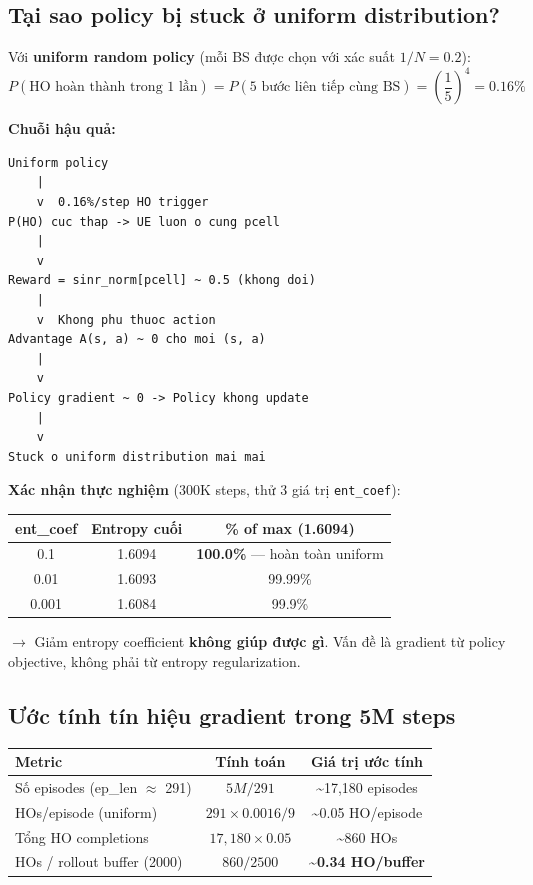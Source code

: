 \documentclass[11pt]{article}
\begin{document}
\subsection{Tại sao policy bị stuck ở uniform distribution?}

Với \textbf{uniform random policy} (mỗi BS được chọn với xác suất $1/N = 0.2$):
\[
P(\text{HO hoàn thành trong 1 lần}) = P(\text{5 bước liên tiếp cùng BS}) = \left(\frac{1}{5}\right)^4 = 0.16\%
\]

\textbf{Chuỗi hậu quả:}

\begin{lstlisting}
Uniform policy
    |
    v  0.16%/step HO trigger
P(HO) cuc thap -> UE luon o cung pcell
    |
    v
Reward = sinr_norm[pcell] ~ 0.5 (khong doi)
    |
    v  Khong phu thuoc action
Advantage A(s, a) ~ 0 cho moi (s, a)
    |
    v
Policy gradient ~ 0 -> Policy khong update
    |
    v
Stuck o uniform distribution mai mai
\end{lstlisting}

\textbf{Xác nhận thực nghiệm} (300K steps, thử 3 giá trị \texttt{ent\_coef}):

\begin{longtable}{@{}ccc@{}}
\toprule
\textbf{ent\_coef} & \textbf{Entropy cuối} & \textbf{\% of max (1.6094)} \\
\midrule
\endhead
0.1 & 1.6094 & \textbf{100.0\%} --- hoàn toàn uniform \\
0.01 & 1.6093 & 99.99\% \\
0.001 & 1.6084 & 99.9\% \\
\bottomrule
\end{longtable}

$\rightarrow$ Giảm entropy coefficient \textbf{không giúp được gì}. Vấn đề là gradient từ policy objective, không phải từ entropy regularization.

\subsection{Ước tính tín hiệu gradient trong 5M steps}

\begin{longtable}{@{}lcc@{}}
\toprule
\textbf{Metric} & \textbf{Tính toán} & \textbf{Giá trị ước tính} \\
\midrule
\endhead
Số episodes (ep\_len $\approx$ 291) & $5M / 291$ & \textasciitilde 17{,}180 episodes \\
HOs/episode (uniform) & $291 \times 0.0016 / 9$ & \textasciitilde 0.05 HO/episode \\
Tổng HO completions & $17{,}180 \times 0.05$ & \textasciitilde 860 HOs \\
HOs / rollout buffer (2000) & $860 / 2500$ & \textbf{\textasciitilde 0.34 HO/buffer} \\
\bottomrule
\end{longtable}
\end{document}
